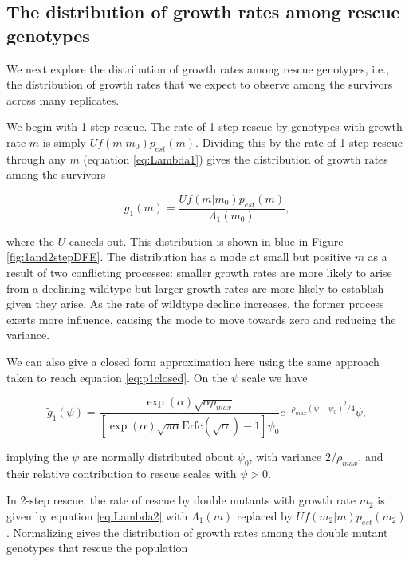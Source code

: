 \documentclass[9pt,twocolumn,twoside,lineno]{gsajnl}
\begin{document}

\subsection{The distribution of growth rates among rescue genotypes}

We next explore the distribution of growth rates among rescue genotypes, i.e., the distribution of growth rates that we expect to observe among the survivors across many replicates.

We begin with 1-step rescue.
The rate of 1-step rescue by genotypes with growth rate $m$ is simply $U f(m|m_0) p_{est}(m)$.
Dividing this by the rate of 1-step rescue through any $m$ (equation \ref{eq:Lambda1}) gives the distribution of growth rates among the survivors

\begin{equation}\label{eq:g1m}
g_1(m) = \frac{U f(m|m_0) p_{est}(m)}{\Lambda_1(m_0)},
\end{equation}

\noindent where the $U$ cancels out.
This distribution is shown in blue in Figure \ref{fig:1and2stepDFE}.
The distribution has a mode at small but positive $m$ as a result of two conflicting processes: smaller growth rates are more likely to arise from a declining wildtype but larger growth rates are more likely to establish given they arise. 
As the rate of wildtype decline increases, the former process exerts more influence, causing the mode to move towards zero and reducing the variance.

We can also give a closed form approximation here using the same approach taken to reach equation \ref{eq:p1closed}.
On the $\psi$ scale we have

\begin{equation}\label{eq:tildeg1m}
\tilde{g}_1(\psi) = \frac{\exp(\alpha)\sqrt{\alpha \rho_{max}}}{[\exp(\alpha)\sqrt{\pi \alpha} \mathrm{Erfc}(\sqrt{\alpha}) - 1]\psi_0} e^{- \rho_{max} (\psi-\psi_0)^2/4} \psi,
\end{equation}

\noindent implying the $\psi$ are normally distributed about $\psi_0$, with variance $2/\rho_{max}$, and their relative contribution to rescue scales with $\psi>0$.

In 2-step rescue, the rate of rescue by double mutants with growth rate $m_2$ is given by equation \ref{eq:Lambda2} with $\Lambda_1(m)$ replaced by $U f(m_2|m) p_{est}(m_2)$.
Normalizing gives the distribution of growth rates among the double mutant genotypes that rescue the population
\end{document}
